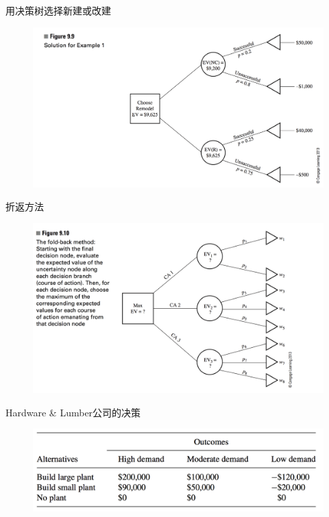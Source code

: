 \documentclass[UTF8]{ctexbeamer}
\begin{document}
\begin{frame}{用决策树选择新建或改建}
  
  \begin{figure}
    \centering
    \includegraphics[width=\textwidth{}]{9_9.png}
  \end{figure}

\end{frame}

\begin{frame}{折返方法}
  
  \begin{figure}
    \centering
    \includegraphics[width=\textwidth{}]{9_10.png}
  \end{figure}

\end{frame}

\begin{frame}{Hardware \& Lumber公司的决策}
  
  \begin{figure}
    \centering
    \includegraphics[width=\textwidth{}]{factories.png}
  \end{figure}

\end{frame}
\end{document}

